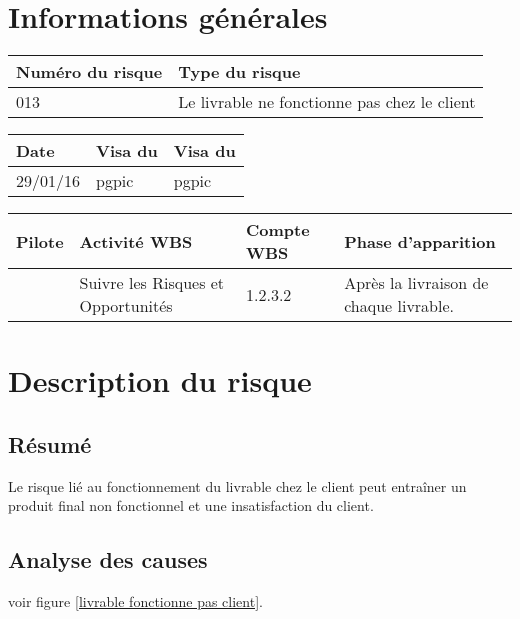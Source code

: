\section*{Informations générales}

\begin{table}[H]
\centering
	\begin{tabularx}{16.8cm}{|X|X|}
	\hline
	\rowcolor{gray!40} Numéro du risque & Type du risque \\
	\hline
	013 & Le livrable ne fonctionne pas chez le client \\
	\hline
	\end{tabularx}
\end{table}

\begin{table}[H]
\centering
	\begin{tabularx}{16.8cm}{|X|X|X|}
	\hline
	\rowcolor{gray!40} Date & Visa du \RQ & Visa du \CP \\
	\hline
	 29/01/16 & pgpic & pgpic \\
	\hline
	\end{tabularx}
\end{table}

\begin{table}[H]
\centering
	\begin{tabularx}{16.8cm}{|X|X|X|X|}
	\hline
	\rowcolor{gray!40} Pilote & Activité WBS & Compte WBS & Phase d'apparition \\
	\hline
	 \Melissa & Suivre les Risques et Opportunités & 1.2.3.2 & Après la livraison de chaque livrable. \\
	\hline
	\end{tabularx}
\end{table}

\section*{Description du risque}

\subsection*{Résumé}
	Le risque lié au fonctionnement du livrable chez le client peut entraîner un produit final non fonctionnel et une insatisfaction du client.
	
\subsection*{Analyse des causes}
	voir figure \ref{livrable fonctionne pas client}.

